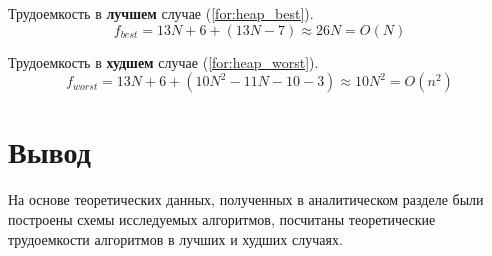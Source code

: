 Трудоемкость в \textbf{лучшем} случае (\ref{for:heap_best}).
\begin{equation}
	\label{for:heap_best}
	f_{best} = 13N + 6 + (13N - 7) \approx 26N = O(N)
\end{equation}

Трудоемкость в \textbf{худшем} случае (\ref{for:heap_worst}).
\begin{equation}
	\label{for:heap_worst}
	f_{worst} = 13N + 6  + (10N^2 - 11N - 10 - 3) \approx 10N^2 = O(n^2)
\end{equation}

\section*{Вывод}
На основе теоретических данных, полученных в аналитическом разделе были построены схемы исследуемых алгоритмов, посчитаны теоретические трудоемкости алгоритмов в лучших и худших случаях.